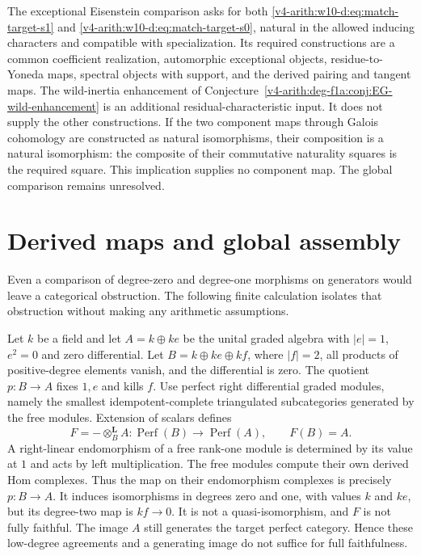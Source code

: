 \begin{remark}
\label{v4-arith:w10-d:thm:class-match}
The exceptional Eisenstein comparison asks for both
\eqref{v4-arith:w10-d:eq:match-target-s1} and
\eqref{v4-arith:w10-d:eq:match-target-s0}, natural in the allowed
inducing characters and compatible with specialization.
Its required constructions are a common coefficient realization,
automorphic exceptional objects, residue-to-Yoneda maps, spectral
objects with support, and the derived pairing and tangent maps.
The wild-inertia enhancement of
Conjecture~\ref{v4-arith:deg-f1a:conj:EG-wild-enhancement} is an
additional residual-characteristic input. It does not supply the
other constructions. If the two component maps through Galois
cohomology are constructed as natural isomorphisms, their composition
is a natural isomorphism: the composite of their commutative naturality
squares is the required square. This implication supplies no component
map. The global comparison remains unresolved.
\end{remark}

\section{Derived maps and global assembly}

Even a comparison of degree-zero and degree-one morphisms on generators
would leave a categorical obstruction. The following finite calculation
isolates that obstruction without making any arithmetic assumptions.

\begin{example}
Let $k$ be a field and let $A=k\oplus ke$ be the unital graded algebra
with $|e|=1$, $e^2=0$ and zero differential. Let
$B=k\oplus ke\oplus kf$, where $|f|=2$, all products of positive-degree
elements vanish, and the differential is zero. The quotient $p:B\to A$
fixes $1,e$ and kills $f$. Use perfect right differential graded modules,
namely the smallest idempotent-complete triangulated subcategories
generated by the free modules. Extension of scalars defines
\[
 F=-\otimes_B^{\mathbf L}A:\operatorname{Perf}(B)
                 \longrightarrow\operatorname{Perf}(A),\qquad F(B)=A.
\]
A right-linear endomorphism of a free rank-one module is determined
by its value at $1$ and acts by left multiplication.
The free modules compute their own derived Hom complexes.
Thus the map on their endomorphism complexes is precisely $p:B\to A$.
It induces isomorphisms in degrees zero and one, with values $k$ and
$ke$, but its degree-two map is $kf\to0$.
It is not a quasi-isomorphism, and $F$ is not fully faithful.
The image $A$ still generates the target perfect category.
Hence these low-degree agreements and a generating image do not
suffice for full faithfulness.
\end{example}

